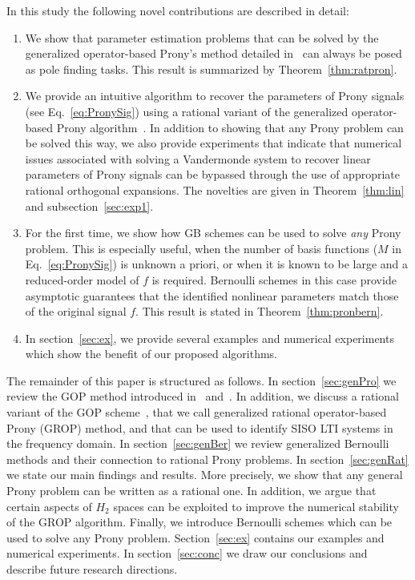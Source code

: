 \documentclass{arxiv}
\begin{document}
In this study the following novel contributions are described in detail:
\begin{enumerate}
    \item We show that parameter estimation problems that can be solved by the generalized operator-based Prony's method detailed in~\cite{stampfer2020generalized} can always be posed as pole finding tasks. This result is summarized by Theorem~\ref{thm:ratpron}.
    \item We provide an intuitive algorithm to recover the parameters of Prony signals (see Eq.~\eqref{eq:PronySig}) using a rational variant of the generalized operator-based Prony algorithm~\cite{dozsa2025system}. In addition to showing that any Prony problem can be solved this way, we also provide experiments that indicate that numerical issues associated with solving a Vandermonde system to recover linear parameters of Prony signals can be bypassed through the use of appropriate rational orthogonal expansions. The novelties are given in Theorem~\ref{thm:lin} and subsection~\ref{sec:exp1}.
    \item For the first time, we show how GB schemes can be used to solve \textit{any} Prony problem. This is especially useful, when the number of basis functions ($M$ in Eq.~\eqref{eq:PronySig}) is unknown a priori, or when it is known to be large and a reduced-order model of $f$ is required. Bernoulli schemes in this case provide asymptotic guarantees that the identified nonlinear parameters match those of the original signal $f$. This result is stated in Theorem~\ref{thm:pronbern}.
    \item In section~\ref{sec:ex}, we provide several examples and numerical experiments which show the benefit of our proposed algorithms. 
\end{enumerate}

The remainder of this paper is structured as follows. In section~\ref{sec:genPro} we review the GOP method introduced in~\cite{peter2013generalized} and~\cite{stampfer2020generalized}. In addition, we discuss a rational variant of the GOP scheme~\cite{dozsa2025system}, that we call generalized rational operator-based Prony (GROP) method, and that can be used to identify SISO LTI systems in the frequency domain. In section~\ref{sec:genBer} we review generalized Bernoulli methods and their connection to rational Prony problems. In section~\ref{sec:genRat} we state our main findings and results. More precisely, we show that any general Prony problem can be written as a  rational one. In addition, we argue that certain aspects of $H_2$ spaces can be exploited to improve the numerical stability of the GROP algorithm. Finally, we introduce Bernoulli schemes which can be used to solve any Prony problem. Section~\ref{sec:ex} contains our examples and numerical experiments. In section~\ref{sec:conc} we draw our conclusions and describe future research directions.
\end{document}
